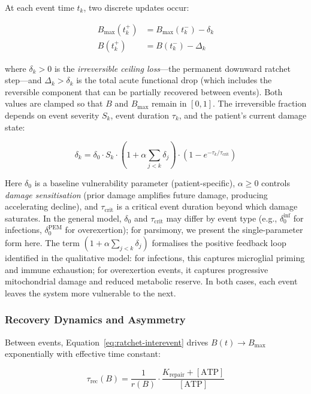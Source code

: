 At each event time $t_k$, two discrete updates occur:

\begin{align}
\label{eq:ratchet-jump-ceiling}
B_{\max}(t_k^+) &= B_{\max}(t_k^-) - \delta_k \\[4pt]
\label{eq:ratchet-jump-acute}
B(t_k^+) &= B(t_k^-) - \Delta_k
\end{align}

where $\delta_k > 0$ is the \emph{irreversible ceiling loss}---the permanent downward ratchet step---and $\Delta_k > \delta_k$ is the total acute functional drop (which includes the reversible component that can be partially recovered between events). Both values are clamped so that $B$ and $B_{\max}$ remain in $[0,1]$. The irreversible fraction depends on event severity $S_k$, event duration $\tau_k$, and the patient's current damage state:

\begin{equation}
\label{eq:ratchet-irreversible-loss}
\delta_k = \delta_0 \cdot S_k \cdot \left(1 + \alpha \sum_{j<k} \delta_j \right) \cdot \left(1 - e^{-\tau_k / \tau_{\text{crit}}}\right)
\end{equation}

Here $\delta_0$ is a baseline vulnerability parameter (patient-specific), $\alpha \geq 0$ controls \emph{damage sensitisation} (prior damage amplifies future damage, producing accelerating decline), and $\tau_{\text{crit}}$ is a critical event duration beyond which damage saturates. In the general model, $\delta_0$ and $\tau_{\text{crit}}$ may differ by event type (e.g., $\delta_0^{\text{inf}}$ for infections, $\delta_0^{\text{PEM}}$ for overexertion); for parsimony, we present the single-parameter form here. The term $(1 + \alpha \sum_{j<k} \delta_j)$ formalises the positive feedback loop identified in the qualitative model: for infections, this captures microglial priming and immune exhaustion; for overexertion events, it captures progressive mitochondrial damage and reduced metabolic reserve. In both cases, each event leaves the system more vulnerable to the next.

\subsubsection{Recovery Dynamics and Asymmetry}

Between events, Equation~\ref{eq:ratchet-interevent} drives $B(t) \to B_{\max}$ exponentially with effective time constant:

\begin{equation}
\label{eq:ratchet-recovery-time}
\tau_{\text{rec}}(B) = \frac{1}{r(B)} \cdot \frac{K_{\text{repair}} + [\text{ATP}]}{[\text{ATP}]}
\end{equation}

